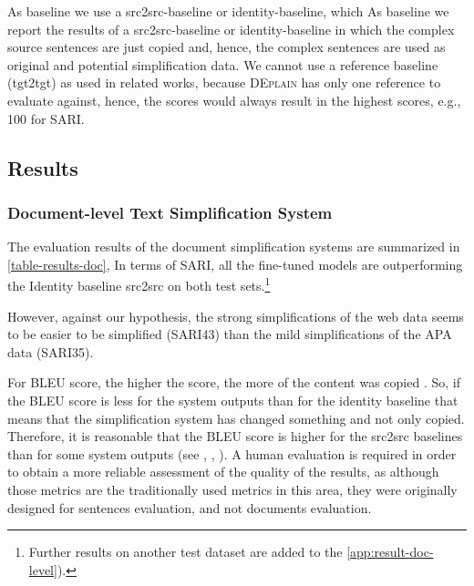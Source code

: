 \documentclass[11pt]{article}
\begin{document}
As baseline we use a src2src-baseline or identity-baseline, which 
As baseline we report the results of a src2src-baseline or identity-baseline in which the complex source sentences are just copied and, hence, the complex sentences are used as original and potential simplification data. We cannot use a reference baseline (tgt2tgt) as used in related works, because \textsc{DEplain} has only one reference to evaluate against, hence, the scores would always result in the highest scores, e.g., 100 for SARI. 

\subsection{Results}
\subsubsection{Document-level Text Simplification System}


The evaluation results of the document simplification systems are summarized in \autoref{table-results-doc}, 
In terms of SARI, all the fine-tuned models are outperforming the Identity baseline src2src on both test sets.\footnote{Further results on another test dataset are added to the \autoref{app:result-doc-level}).}

However, against our hypothesis, the strong simplifications of the web data seems to be easier to be simplified (SARI43) than the mild simplifications of the APA data (SARI35). 

For BLEU score, the higher the score, the more of the content was copied \cite{chatterjee-agarwal-2021-depsym}. So, if the BLEU score is less for the system outputs than for the identity baseline that means that the simplification system has changed something and not only copied. Therefore, it is reasonable that the BLEU score is higher for the src2src baselines than for some system outputs (see \citealt{xu-etal-2016-optimizing}, \citet{sulem-etal-2018-simple}, \cite{chatterjee-agarwal-2021-depsym}).
A human evaluation is required in order to obtain a more reliable assessment of the quality of the results, as although those metrics are the traditionally used metrics in this area, they were originally designed for sentences evaluation, and not documents evaluation. 
\end{document}
